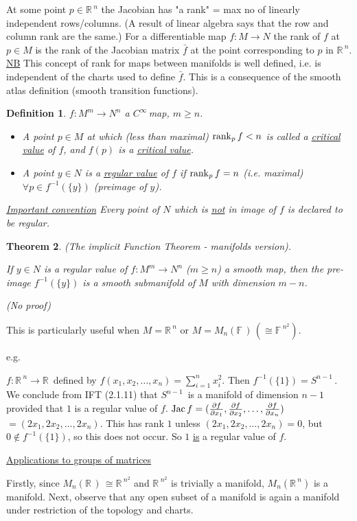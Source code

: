 \documentclass[12pt,a4paper]{article}
\newcommand{\rR}{\ensuremath{\mathbb{R}\,}}
\newcommand{\fF}{\ensuremath{\mathbb{F}\,}}
\newcommand{\cinf}{\ensuremath{C^{\infty}\,}}
\newcommand{\mnr}{\ensuremath{M_n(\rR)\,}}
\newcommand{\mnf}{\ensuremath{M_n(\fF)\,}}
\newcommand{\sph}[1]{\ensuremath{S^{#1}}\,}
\newcommand{\ul}[1]{\underline{#1}}
\newcommand{\jac}[1]{\ensuremath{\operatorname{Jac}{#1}}}
\newtheorem{thm}{Theorem}[subsubsection]
\newtheorem{defn}[thm]{Definition}
\begin{document}
At some point $p\in \rR^n$ the Jacobian has "a rank" = max no of linearly independent rows/columns. (A result of linear algebra says that the row and column rank are the same.) For a differentiable map $f:M\to N$ the rank of $f$ at $p\in M$ is the rank of the Jacobian matrix $\bar{f}$ at the point corresponding to $p$ in $\rR^n$. 
\ul{NB} This concept of rank for maps between manifolds is well defined, i.e. is independent of the charts used to define $\bar{f}$. This is a consequence of the smooth atlas definition (smooth transition functions).

\begin{defn}
$f:M^m\to N^n$ a \cinf map, $m\geq n$.
\begin{itemize}
\item[a)] A point $p\in M$ at which (less than maximal) $\rank_{p}{f}<n$ is called a \ul{critical value} of $f$, and $f(p)$ is a \ul{critical value}.
\item[b)] A point $y\in N$ is a \ul{regular value} of $f$ if $\rank_{p}{f}=n$ (i.e. maximal) $\forall p \in f^{-1}(\{y\})$ (preimage of $y$).
\end{itemize}
\ul{Important convention}
Every point of $N$ which is \ul{not} in image of $f$ is declared to be regular.
\end{defn}

\begin{thm}
(The implicit Function Theorem - manifolds version).

If $y\in N$ is a regular value of $f:M^m\to N^n$ ($m\geq n$) a smooth map, then the pre-image $f^{-1}(\{y\})$ is a smooth submanifold of $M$ with dimension $m-n$. 

(No proof)
\end{thm}
 
This is particularly useful when $M=\rR^n$ or $M=\mnf (\cong \fF^{n^2})$.

e.g.

$f:\rR^n \to \rR$ defined by $f(x_1,x_2,\ldots, x_n)=\sum\limits_{i=1}^n x_i^2$. Then $f^{-1}(\{1\})=\sph{n-1}$. We conclude from IFT (2.1.11) that $\sph{n-1}$ is a manifold of dimension $n-1$ provided that $1$ is a regular value of $f$.  $\jac{f}=(\pdv{f}{x_1},\pdv{f}{x_2},\ldots,\pdv{f}{x_n})$ $=(2x_1,2x_2,\ldots,2x_n)$. This has rank $1$ unless $(2x_1,2x_2,\ldots,2x_n)=0$, but $0\not\in f^{-1}(\{1\})$, so this does not occur. So $1$ \ul{is} a regular value of $f$.

\ul{Applications to groups of matrices}

Firstly, since $\mnr\cong \rR^{n^2}$ and $\rR^{n^2}$ is trivially a manifold, $M_n(\rR^n)$ is a manifold. Next, observe that any open subset of a manifold is again a manifold under restriction of the topology and charts.
\end{document}
